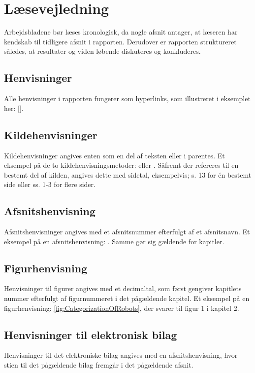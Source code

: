 \section*{Læsevejledning}
\label{Laesevejledning}
Arbejdsbladene bør læses kronologisk, da nogle afsnit antager, at læseren har kendskab til tidligere afsnit i rapporten. Derudover er rapporten struktureret således, at resultater og viden løbende diskuteres og konkluderes.

\subsection*{Henvisninger}
Alle henvisninger i rapporten fungerer som hyperlinks, som illustreret i eksemplet her: \autoref{}.

\subsection*{Kildehenvisninger}
Kildehenvisninger angives enten som en del af teksten eller i parentes. Et eksempel på de to kildehenvisningsmetoder: \textcite[s. 13]{PDF:RobotShiftFromIPtoSR} eller \parencite[s. 13]{PDF:RobotShiftFromIPtoSR}. Såfremt der refereres til en bestemt del af kilden, angives dette med sidetal, eksempelvis; s. 13 for én bestemt side eller ss. 1-3 for flere sider.
%
\subsection*{Afsnitshenvisning}
Afsnitshenvisninger angives med et afsnitsnummer efterfulgt af et afsnitsnavn. Et eksempel på en afsnitshenvisning: . Samme gør sig gældende for kapitler.
%
\subsection*{Figurhenvisning}
Henvisninger til figurer angives med et decimaltal, som først gengiver kapitlets nummer efterfulgt af figurnummeret i det pågældende kapitel. Et eksempel på en figurhenvisning: \autoref{fig:CategorizationOfRobots}, der svarer til figur 1 i kapitel 2. 
%
\subsection*{Henvisninger til elektronisk bilag}
Henvisninger til det elektroniske bilag angives med en afsnitshenvisning, hvor stien til det pågældende bilag fremgår i det pågældende afsnit. 



